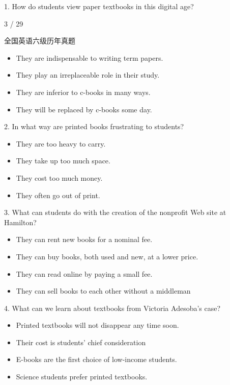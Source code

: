 \documentclass[UTF8,11pt]{ctexart}
\begin{document}
1. How do students view paper textbooks in this digital age?


3 / 29


全国英语六级历年真题


\begin{itemize}[leftmargin=2em,itemsep=.2em,topsep=.4em]\item[A.] They are indispensable to writing term papers.
\item[B.] They play an irreplaceable role in their study.
\item[C.] They are inferior to c-books in many ways.
\item[D.] They will be replaced by c-books some day.
\end{itemize}

2. In what way are printed books frustrating to students?


\begin{itemize}[leftmargin=2em,itemsep=.2em,topsep=.4em]\item[A.] They are too heavy to carry.
\item[B.] They take up too much space.
\item[C.] They cost too much money.
\item[D.] They often go out of print.
\end{itemize}

3. What can students do with the creation of the nonprofit Web site at Hamilton?


\begin{itemize}[leftmargin=2em,itemsep=.2em,topsep=.4em]\item[A.] They can rent new books for a nominal fee.
\item[B.] They can buy books, both used and new, at a lower price.
\item[C.] They can read online by paying a small fee.
\item[D.] They can sell books to each other without a middleman
\end{itemize}

4. What can we learn about textbooks from Victoria Adesoba's case?


\begin{itemize}[leftmargin=2em,itemsep=.2em,topsep=.4em]\item[A.] Printed textbooks will not disappear any time soon.
\item[B.] Their cost is students' chief consideration
\item[C.] E-books are the first choice of low-income students.
\item[D.] Science students prefer printed textbooks.
\end{itemize}
\end{document}
